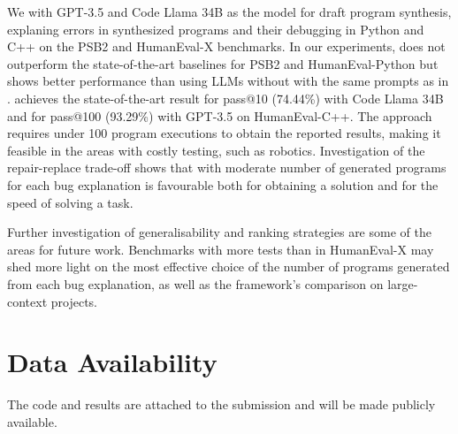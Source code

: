 We \method{} with GPT-3.5 and Code Llama 34B as the model for draft program synthesis, explaning errors in synthesized programs and their debugging in Python and C++ on the PSB2 and HumanEval-X benchmarks. 
In our experiments, \method{} does not outperform the state-of-the-art baselines for PSB2 and HumanEval-Python but shows better performance than using LLMs without \method{} with the same prompts as in \method{}.
\method{} achieves the state-of-the-art result for pass@10 (74.44\%) with Code Llama 34B and for pass@100 (93.29\%) with GPT-3.5 on HumanEval-C++. 
The approach requires under 100 program executions to obtain the reported results, 
making it feasible in the areas with costly testing, such as robotics.
Investigation of the repair-replace trade-off shows that \method{} with moderate number of generated programs for each bug explanation is favourable both for obtaining a solution and for the speed of solving a task. 

Further investigation of \method{} generalisability and ranking strategies are some of the areas for future work. 
Benchmarks with more tests than in HumanEval-X may shed more light on the most effective choice of the number of programs generated from each bug explanation, as well as the framework's comparison on large-context projects. 

\vspace*{-1mm}
\section*{Data Availability}
The code and results are attached to the submission and will be made publicly available.
